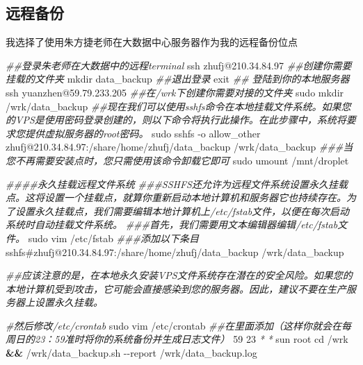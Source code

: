 \documentclass[
]{book}
\newenvironment{Shaded}{\begin{snugshade}}{\end{snugshade}}
\newcommand{\AttributeTok}[1]{\textcolor[rgb]{0.77,0.63,0.00}{#1}}
\newcommand{\BuiltInTok}[1]{#1}
\newcommand{\CommentTok}[1]{\textcolor[rgb]{0.56,0.35,0.01}{\textit{#1}}}
\newcommand{\ExtensionTok}[1]{#1}
\newcommand{\FunctionTok}[1]{\textcolor[rgb]{0.00,0.00,0.00}{#1}}
\newcommand{\KeywordTok}[1]{\textcolor[rgb]{0.13,0.29,0.53}{\textbf{#1}}}
\newcommand{\NormalTok}[1]{#1}
\newcommand{\PreprocessorTok}[1]{\textcolor[rgb]{0.56,0.35,0.01}{\textit{#1}}}
\begin{document}
\hypertarget{ux8fdcux7a0bux5907ux4efd}{%
\subsection{远程备份}\label{ux8fdcux7a0bux5907ux4efd}}

我选择了使用朱方捷老师在大数据中心服务器作为我的远程备份位点

\begin{Shaded}
\begin{Highlighting}[]
\CommentTok{\#\#登录朱老师在大数据中的远程terminal}
\FunctionTok{ssh}\NormalTok{ zhufj@210.34.84.97}
\CommentTok{\#\#创建你需要挂载的文件夹}
\FunctionTok{mkdir}\NormalTok{ data\_backup}
\CommentTok{\#\#退出登录}
\BuiltInTok{exit}
\CommentTok{\#\# 登陆到你的本地服务器}
\FunctionTok{ssh}\NormalTok{ yuanzhen@59.79.233.205}
\CommentTok{\#\#在/wrk下创建你需要对接的文件夹}
\FunctionTok{sudo}\NormalTok{ mkdir /wrk/data\_backup}
\CommentTok{\#\#现在我们可以使用sshfs命令在本地挂载文件系统。如果您的VPS是使用密码登录创建的，则以下命令将执行此操作。在此步骤中，系统将要求您提供虚拟服务器的root密码。}
\FunctionTok{sudo}\NormalTok{ sshfs }\AttributeTok{{-}o}\NormalTok{ allow\_other zhufj@210.34.84.97:/share/home/zhufj/data\_backup /wrk/data\_backup}
\CommentTok{\#\#\#当您不再需要安装点时，您只需使用该命令卸载它即可}
\FunctionTok{sudo}\NormalTok{ umount /mnt/droplet}



\CommentTok{\#\#\#\#永久挂载远程文件系统}
\CommentTok{\#\#\#SSHFS还允许为远程文件系统设置永久挂载点。这将设置一个挂载点，就算你重新启动本地计算机和服务器它也持续存在。为了设置永久挂载点，我们需要编辑本地计算机上\textasciigrave{}/etc/fstab\textasciigrave{}文件，以便在每次启动系统时自动挂载文件系统。}
\CommentTok{\#\#\#首先，我们需要用文本编辑器编辑\textasciigrave{}/etc/fstab\textasciigrave{}文件。}
\FunctionTok{sudo}\NormalTok{ vim /etc/fstab}
\CommentTok{\#\#\#添加以下条目}
\ExtensionTok{sshfs\#zhufj@210.34.84.97:/share/home/zhufj/data\_backup}\NormalTok{ /wrk/data\_backup}

\CommentTok{\#\#应该注意的是，在本地永久安装VPS文件系统存在潜在的安全风险。如果您的本地计算机受到攻击，它可能会直接感染到您的服务器。因此，建议不要在生产服务器上设置永久挂载。}

\CommentTok{\#然后修改/etc/crontab}
\FunctionTok{sudo}\NormalTok{ vim /etc/crontab}
\CommentTok{\#\#在里面添加（这样你就会在每周日的23：59准时将你的系统备份并生成日志文件）}
\ExtensionTok{59}\NormalTok{ 23   }\PreprocessorTok{*} \PreprocessorTok{*}\NormalTok{ sun root    cd /wrk }\KeywordTok{\&\&} \ExtensionTok{/wrk/data\_backup.sh} \AttributeTok{{-}{-}report}\NormalTok{ /wrk/data\_backup.log}
\end{Highlighting}
\end{Shaded}
\end{document}
